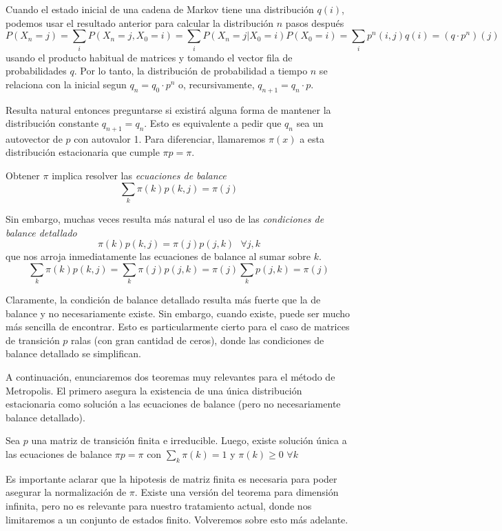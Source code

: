 Cuando el estado inicial de una cadena de Markov tiene una distribución $q(i)$, podemos usar el resultado anterior para calcular la distribución $n$ pasos después
\[ P(X_n=j) = \sum_i P(X_n=j,X_0=i) =  \sum_i P(X_n=j|X_0=i)P(X_0=i) = \sum_i p^n(i,j)q(i) = (q\cdot p^n)(j)\]
usando el producto habitual de matrices y tomando el vector fila de probabilidades $q$.
Por lo tanto, la distribución de probabilidad a tiempo $n$ se relaciona con la inicial segun $q_n = q_0\cdot p^n$ o, recursivamente, $q_{n+1} = q_n\cdot p$.

Resulta natural entonces preguntarse si existirá alguna forma de mantener la distribución constante $q_{n+1} = q_n$.
Esto es equivalente a pedir que $q_n$ sea un autovector de $p$ con autovalor 1.
Para diferenciar, llamaremos $\pi(x)$ a esta distribución estacionaria que cumple $\pi p = \pi$.

Obtener $\pi$ implica resolver las \textit{ecuaciones de balance}
\[ \sum_k \pi(k) p(k, j) = \pi(j) \]

Sin embargo, muchas veces resulta más natural el uso de las \textit{condiciones de balance detallado}
\[ \pi(k) p(k, j) = \pi(j)p(j, k) \text{ } \forall j,k \]
que nos arroja inmediatamente las ecuaciones de balance al sumar sobre $k$.
\[ \sum_k \pi(k) p(k, j) = \sum_k \pi(j)p(j, k) = \pi(j) \sum_k p(j,k) = \pi(j) \]

Claramente, la condición de balance detallado resulta más fuerte que la de balance y no necesariamente existe.
Sin embargo, cuando existe, puede ser mucho más sencilla de encontrar.
Esto es particularmente cierto para el caso de matrices de transición $p$ ralas (con gran cantidad de ceros), donde las condiciones de balance detallado se simplifican.

A continuación, enunciaremos dos teoremas muy relevantes para el método de Metropolis.
El primero asegura la existencia de una única distribución estacionaria como solución a las ecuaciones de balance (pero no necesariamente balance detallado).

\begin{theorem}
 Sea $p$ una matriz de transición finita e irreducible. Luego, existe solución única a las ecuaciones de balance $\pi p = \pi$ con $\sum_k \pi(k) = 1$ y $\pi(k)\geq 0$ $\forall k$
\end{theorem}

Es importante aclarar que la hipotesis de matriz finita es necesaria para poder asegurar la normalización de $\pi$.
Existe una versión del teorema para dimensión infinita, pero no es relevante para nuestro tratamiento actual, donde nos limitaremos a un conjunto de estados finito.
Volveremos sobre esto más adelante.

